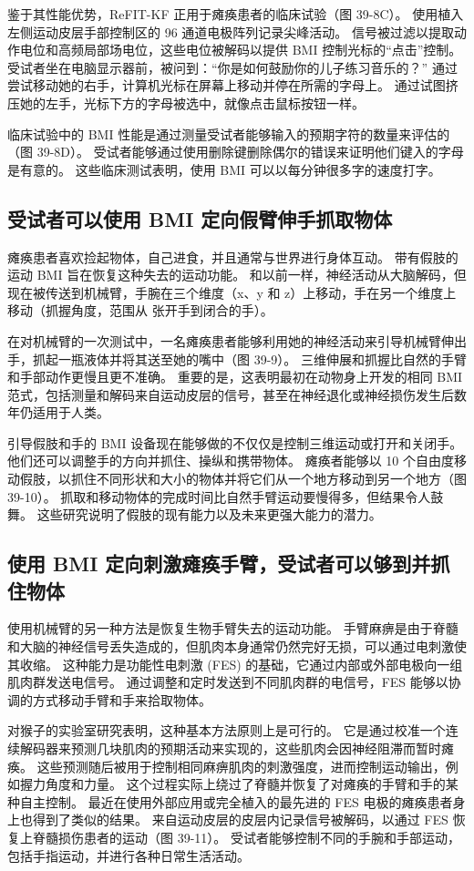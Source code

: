 鉴于其性能优势，ReFIT-KF 正用于瘫痪患者的临床试验（图 39-8C）。 使用植入左侧运动皮层手部控制区的 96 通道电极阵列记录尖峰活动。 信号被过滤以提取动作电位和高频局部场电位，这些电位被解码以提供 BMI 控制光标的“点击”控制。 受试者坐在电脑显示器前，被问到：“你是如何鼓励你的儿子练习音乐的？” 通过尝试移动她的右手，计算机光标在屏幕上移动并停在所需的字母上。 通过试图挤压她的左手，光标下方的字母被选中，就像点击鼠标按钮一样。

临床试验中的 BMI 性能是通过测量受试者能够输入的预期字符的数量来评估的（图 39-8D）。 受试者能够通过使用删除键删除偶尔的错误来证明他们键入的字母是有意的。 这些临床测试表明，使用 BMI 可以以每分钟很多字的速度打字。

\subsection{受试者可以使用 BMI 定向假臂伸手抓取物体}
瘫痪患者喜欢捡起物体，自己进食，并且通常与世界进行身体互动。 带有假肢的运动 BMI 旨在恢复这种失去的运动功能。 和以前一样，神经活动从大脑解码，但现在被传送到机械臂，手腕在三个维度（x、y 和 z）上移动，手在另一个维度上移动（抓握角度，范围从 张开手到闭合的手）。

在对机械臂的一次测试中，一名瘫痪患者能够利用她的神经活动来引导机械臂伸出手，抓起一瓶液体并将其送至她的嘴中（图 39-9）。 三维伸展和抓握比自然的手臂和手部动作更慢且更不准确。 重要的是，这表明最初在动物身上开发的相同 BMI 范式，包括测量和解码来自运动皮层的信号，甚至在神经退化或神经损伤发生后数年仍适用于人类。

引导假肢和手的 BMI 设备现在能够做的不仅仅是控制三维运动或打开和关闭手。 他们还可以调整手的方向并抓住、操纵和携带物体。 瘫痪者能够以 10 个自由度移动假肢，以抓住不同形状和大小的物体并将它们从一个地方移动到另一个地方（图 39-10）。 抓取和移动物体的完成时间比自然手臂运动要慢得多，但结果令人鼓舞。 这些研究说明了假肢的现有能力以及未来更强大能力的潜力。

\subsection{使用 BMI 定向刺激瘫痪手臂，受试者可以够到并抓住物体}
使用机械臂的另一种方法是恢复生物手臂失去的运动功能。 手臂麻痹是由于脊髓和大脑的神经信号丢失造成的，但肌肉本身通常仍然完好无损，可以通过电刺激使其收缩。 这种能力是功能性电刺激 (FES) 的基础，它通过内部或外部电极向一组肌肉群发送电信号。 通过调整和定时发送到不同肌肉群的电信号，FES 能够以协调的方式移动手臂和手来拾取物体。

对猴子的实验室研究表明，这种基本方法原则上是可行的。 它是通过校准一个连续解码器来预测几块肌肉的预期活动来实现的，这些肌肉会因神经阻滞而暂时瘫痪。 这些预测随后被用于控制相同麻痹肌肉的刺激强度，进而控制运动输出，例如握力角度和力量。 这个过程实际上绕过了脊髓并恢复了对瘫痪的手臂和手的某种自主控制。 最近在使用外部应用或完全植入的最先进的 FES 电极的瘫痪患者身上也得到了类似的结果。 来自运动皮层的皮层内记录信号被解码，以通过 FES 恢复上脊髓损伤患者的运动（图 39-11）。 受试者能够控制不同的手腕和手部运动，包括手指运动，并进行各种日常生活活动。


